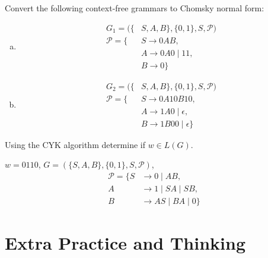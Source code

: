 \documentclass[a4paper,12pt]{amsart}
\begin{document}
\medskip\begin{problem}

    Convert the following context-free grammars to Chomsky normal form:
    \begin{multicols}{2}
        \begin{enumerate}[(a)]
    
            \item 
            \begin{align*}
            G_1=(\{&S,A,B\},\{0,1\},S,\mathcal P)\\
            \mathcal P=\{&S\rightarrow 0AB, \\
            &A\rightarrow 0A0\mid 11,\\
            &B\rightarrow 0\}
            \end{align*}
    
            \item 
            \begin{align*}
            G_2=(\{&S,A,B\},\{0,1\},S,\mathcal P)\\
            \mathcal P=\{
            &S\rightarrow 0A10B10, \\
            &A\rightarrow 1A0\mid \epsilon,\\
            &B\rightarrow 1B00\mid \epsilon\} 
            \end{align*}

        \end{enumerate}
    \end{multicols}
        
\end{problem}


\medskip\begin{problem}
    
    Using the CYK algorithm determine if $w\in L(G)$.

    $w=0110$, $G=(\{S,A,B\},\{0, 1\},S,\mathcal P)$,        
        \begin{align*}
            \mathcal P=\{S&\rightarrow 0\mid AB, \\
            A&\rightarrow 1\mid SA\mid SB, \\
            B&\rightarrow AS \mid BA \mid 0\}
        \end{align*}    

\end{problem}


\section*{Extra Practice and Thinking}
\end{document}
